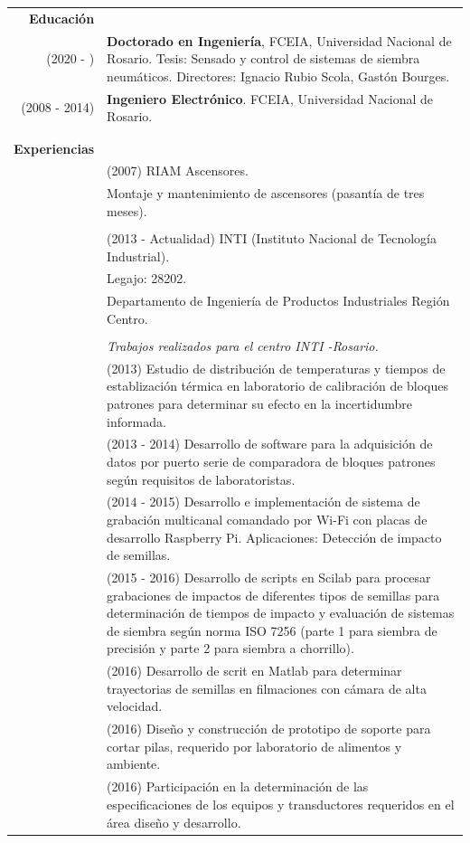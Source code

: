 \documentclass[a4paper,10pt, sans]{article}
\begin{document}
\begin{table}[H]
\begin{tabularx}{\textwidth}{r X}         
    \textbf{Educación} & {} \\ [1ex]
       (2020 - ) & \textbf{Doctorado en Ingeniería}, FCEIA, Universidad Nacional de Rosario. Tesis: Sensado y control de sistemas de siembra neumáticos. Directores: Ignacio Rubio Scola, Gastón Bourges.\\ [1ex]
       (2008 - 2014) & \textbf{Ingeniero Electrónico}. FCEIA, Universidad Nacional de Rosario.\\ \\ \hline \\
    \textbf{Experiencias} & {} \\ [1ex]
      {} & (2007) RIAM Ascensores. \\
      {} & Montaje y mantenimiento de ascensores (pasantía de tres meses). \\ \\
      {} & (2013 - Actualidad) INTI (Instituto Nacional de Tecnología Industrial). \\
      {} & Legajo: 28202. \\
      {} & Departamento de Ingeniería de Productos Industriales Región Centro.\\ \\
              
        {} &  \textit{Trabajos realizados para el centro INTI -Rosario.} \\
        {} & (2013) Estudio de distribución de temperaturas y tiempos de establización térmica en laboratorio de calibración de bloques patrones  para determinar su efecto en la incertidumbre informada. \\
        {} & (2013 - 2014) Desarrollo de software para la adquisición de datos por puerto serie de comparadora de bloques patrones según requisitos de laboratoristas. \\
        {} & (2014 - 2015) Desarrollo e implementación de sistema de grabación multicanal comandado por Wi-Fi con placas de desarrollo Raspberry Pi. Aplicaciones: Detección de impacto de semillas. \\
        {} & (2015 - 2016) Desarrollo de scripts en Scilab para procesar grabaciones de impactos de diferentes tipos de semillas para determinación de tiempos de impacto y evaluación de sistemas de siembra según norma ISO 7256 (parte 1 para siembra de precisión y parte 2 para siembra a chorrillo). \\
        {} & (2016) Desarrollo de scrit en Matlab para determinar trayectorias de semillas en filmaciones con cámara de alta velocidad. \\
        {} & (2016) Diseño y construcción de prototipo de soporte para cortar pilas, requerido por laboratorio de alimentos y ambiente. \\
        {} & (2016) Participación en la determinación de las especificaciones de los equipos y transductores requeridos en el área diseño y desarrollo. \\
\end{tabularx}
\end{table}
\end{document}
